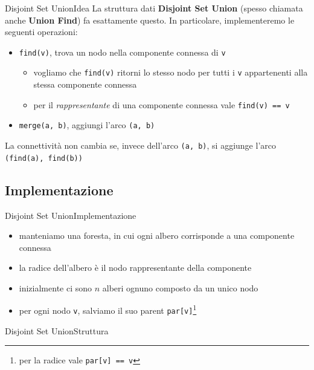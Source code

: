\documentclass[compress]{beamer}
\begin{document}
\begin{frame}{Disjoint Set Union}{Idea}
    La struttura dati \textbf{Disjoint Set Union} (spesso chiamata anche \textbf{Union Find}) fa esattamente questo.
    In particolare, implementeremo le seguenti operazioni:
    \pause
    \begin{itemize}
        \item \texttt{find(v)}, trova un nodo nella componente connessa di \texttt{v}
            \pause
            \begin{itemize}
                \item vogliamo che \texttt{find(v)} ritorni lo stesso nodo per tutti i \texttt{v} appartenenti alla stessa componente connessa
                \item per il \textit{rappresentante} di una componente connessa vale \texttt{find(v)~==~v}
            \end{itemize}
        \pause
        \item \texttt{merge(a, b)}, aggiungi l'arco \texttt{(a, b)}
    \end{itemize}
    \pause
    \begin{alertblock}{}
        La connettivit\`a non cambia se, invece dell'arco \texttt{(a, b)}, si aggiunge l'arco \texttt{(find(a), find(b))}
    \end{alertblock}
\end{frame}

\subsection{Implementazione}
\begin{frame}{Disjoint Set Union}{Implementazione}
    \begin{itemize}
        \item manteniamo una foresta, in cui ogni albero corrisponde a una componente connessa
        \item la radice dell'albero \`e il nodo rappresentante della componente
        \item inizialmente ci sono $n$ alberi ognuno composto da un unico nodo
        \item per ogni nodo \texttt{v}, salviamo il suo parent \texttt{par[v]}\footnote{per la radice vale \texttt{par[v] == v}}
    \end{itemize}
\end{frame}

\begin{frame}{Disjoint Set Union}{Struttura}
\end{frame}
\end{document}
